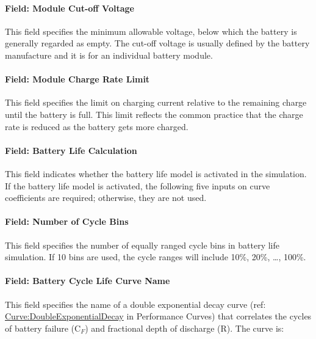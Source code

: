 \paragraph{Field: Module Cut-off Voltage}\label{field-module-cut-off-voltage}

This field specifies the minimum allowable voltage, below which the battery is generally regarded as empty. The cut-off voltage is usually defined by the battery manufacture and it is for an individual battery module.

\paragraph{Field: Module Charge Rate Limit}\label{field-module-charge-rate-limit}

This field specifies the limit on charging current relative to the remaining charge until the battery is full. This limit reflects the common practice that the charge rate is reduced as the battery gets more charged.

\paragraph{Field: Battery Life Calculation}\label{field-battery-life-calculation}

This field indicates whether the battery life model is activated in the simulation. If the battery life model is activated, the following five inputs on curve coefficients are required; otherwise, they are not used.

\paragraph{Field: Number of Cycle Bins}\label{field-number-of-cycle-bins}

This field specifies the number of equally ranged cycle bins in battery life simulation. If 10 bins are used, the cycle ranges will include 10\%, 20\%, \ldots{}, 100\%.

\paragraph{Field: Battery Cycle Life Curve Name}\label{field-battery-cycle-life-curve-name}

This field specifies the name of a double exponential decay curve (ref: \hyperref[curvedoubleexponentialdecay]{Curve:DoubleExponentialDecay} in Performance Curves) that correlates the cycles of battery failure (C\(_{F}\)) and fractional depth of discharge (R). The curve is:

